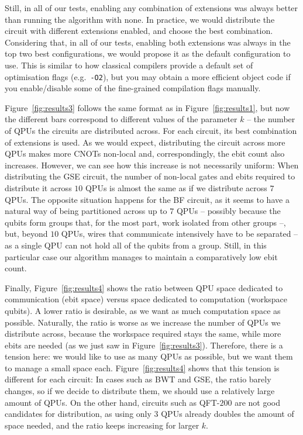 

Still, in all of our tests, enabling any combination of extensions was always better than running the algorithm with none. In practice, we would distribute the circuit with different extensions enabled, and choose the best combination. Considering that, in all of our tests, enabling both extensions was always in the top two best configurations, we would propose it as the default configuration to use. This is similar to how classical compilers provide a default set of optimisation flags (e.g.\ \texttt{-O2}), but you may obtain a more efficient object code if you enable/disable some of the fine-grained compilation flags manually.



Figure~\ref{fig:results3} follows the same format as in Figure~\ref{fig:results1}, but now the different bars correspond to different values of the parameter \(k\) -- the number of QPUs the circuits are distributed across. For each circuit, its best combination of extensions is used. As we would expect, distributing the circuit across more QPUs makes more CNOTs non-local and, correspondingly, the ebit count also increases. However, we can see how this increase is not necessarily uniform: When distributing the GSE circuit, the number of non-local gates and ebits required to distribute it across \(10\) QPUs is almost the same as if we distribute across \(7\) QPUs. The opposite situation happens for the BF circuit, as it seems to have a natural way of being partitioned across up to \(7\) QPUs -- possibly because the qubits form groups that, for the most part, work isolated from other groups --, but, beyond \(10\) QPUs, wires that communicate intensively have to be separated -- as a single QPU can not hold all of the qubits from a group. Still, in this particular case our algorithm manages to maintain a comparatively low ebit count. 



Finally, Figure~\ref{fig:results4} shows the ratio between QPU space dedicated to communication (ebit space) versus space dedicated to computation (workspace qubits). A lower ratio is desirable, as we want as much computation space as possible. Naturally, the ratio is worse as we increase the number of QPUs we distribute across, because the workspace required stays the same, while more ebits are needed (as we just saw in Figure~\ref{fig:results3}). Therefore, there is a tension here: we would like to use as many QPUs as possible, but we want them to manage a small space each. Figure~\ref{fig:results4} shows that this tension is different for each circuit: In cases such as BWT and GSE, the ratio barely changes, so if we decide to distribute them, we should use a relatively large amount of QPUs. On the other hand, circuits such as QFT-\(200\) are not good candidates for distribution, as using only \(3\) QPUs already doubles the amount of space needed, and the ratio keeps increasing for larger \(k\).


